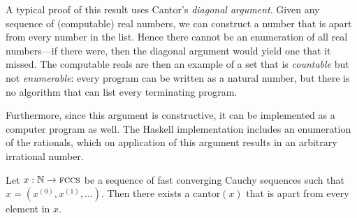 \documentclass[leqno]{report}
\begin{document}
A typical proof of this result uses Cantor's \textit{diagonal argument}. Given any sequence of (computable) real numbers, we can construct a number that is apart from every number in the list. Hence there cannot be an enumeration of all real numbers---if there were, then the diagonal argument would yield one that it missed. The computable reals are then an example of a set that is \textit{countable} but not \textit{enumerable}: every program can be written as a natural number, but there is no algorithm that can list every terminating program.

Furthermore, since this argument is constructive, it can be implemented as a computer program as well. The Haskell implementation includes an enumeration of the rationals, which on application of this argument results in an arbitrary irrational number.

\begin{Proposition}
    Let $x : \mathbb{N} \rightarrow \textsc{fccs}$ be a sequence of fast converging Cauchy sequences such that $x = (x^{(0)}, x^{(1)}, \ldots)$. Then there exists a \FCCS{} $\mathrm{cantor}(x)$ that is apart from every element in $x$.
\end{Proposition}
\end{document}
